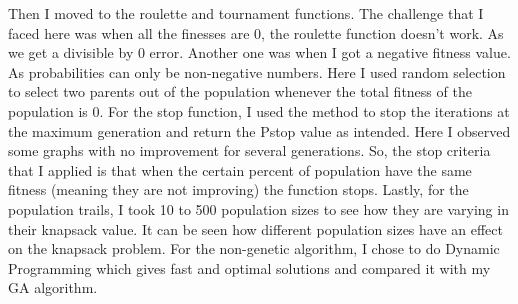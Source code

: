 \documentclass{article}
\begin{document}
Then I moved to the roulette and tournament functions. The challenge that I faced here was when all the finesses are 0, the roulette function doesn’t work. As we get a divisible by 0 error. Another one was when I got a negative fitness value. As probabilities can only be non-negative numbers. Here I used random selection to select two parents out of the population whenever the total fitness of the population is 0. For the stop function, I used the method to stop the iterations at the maximum generation and return the Pstop value as intended. Here I observed some graphs with no improvement for several generations. So, the stop criteria that I applied is that when the certain percent of population have the same fitness (meaning they are not improving) the function stops. Lastly, for the population trails, I took 10 to 500 population sizes to see how they are varying in their knapsack value. It can be seen how different population sizes have an effect on the knapsack problem. For the non-genetic algorithm, I chose to do Dynamic Programming which gives fast and optimal solutions and compared it with my GA algorithm.
\end{document}
